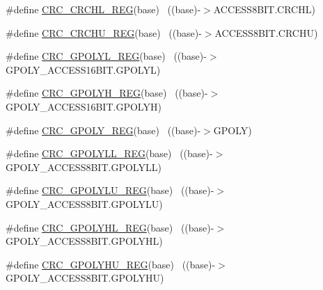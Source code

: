 \begin{DoxyCompactItemize}
\item 
\#define \hyperlink{group___c_r_c___register___accessor___macros_ga89be07710e8d08250ca3b8dcbf6dd7ad}{C\+R\+C\+\_\+\+C\+R\+C\+H\+L\+\_\+\+R\+EG}(base)                                        ~((base)-\/$>$A\+C\+C\+E\+S\+S8\+B\+I\+T.\+C\+R\+C\+HL)
\item 
\#define \hyperlink{group___c_r_c___register___accessor___macros_ga4cf80e6cff3baf934f320fa9d78e3723}{C\+R\+C\+\_\+\+C\+R\+C\+H\+U\+\_\+\+R\+EG}(base)                                        ~((base)-\/$>$A\+C\+C\+E\+S\+S8\+B\+I\+T.\+C\+R\+C\+HU)
\item 
\#define \hyperlink{group___c_r_c___register___accessor___macros_gab1698faf3a8970f99f403444ebb4d2c8}{C\+R\+C\+\_\+\+G\+P\+O\+L\+Y\+L\+\_\+\+R\+EG}(base)                                      ~((base)-\/$>$G\+P\+O\+L\+Y\+\_\+\+A\+C\+C\+E\+S\+S16\+B\+I\+T.\+G\+P\+O\+L\+YL)
\item 
\#define \hyperlink{group___c_r_c___register___accessor___macros_gafad4f84e32d790a7fe24cd92b2c480dd}{C\+R\+C\+\_\+\+G\+P\+O\+L\+Y\+H\+\_\+\+R\+EG}(base)                                      ~((base)-\/$>$G\+P\+O\+L\+Y\+\_\+\+A\+C\+C\+E\+S\+S16\+B\+I\+T.\+G\+P\+O\+L\+YH)
\item 
\#define \hyperlink{group___c_r_c___register___accessor___macros_ga4380a8ebc7eff991b5db31a826e12c34}{C\+R\+C\+\_\+\+G\+P\+O\+L\+Y\+\_\+\+R\+EG}(base)                                        ~((base)-\/$>$G\+P\+O\+LY)
\item 
\#define \hyperlink{group___c_r_c___register___accessor___macros_gaf49775745cf42c0370512f2c0058acd7}{C\+R\+C\+\_\+\+G\+P\+O\+L\+Y\+L\+L\+\_\+\+R\+EG}(base)                                    ~((base)-\/$>$G\+P\+O\+L\+Y\+\_\+\+A\+C\+C\+E\+S\+S8\+B\+I\+T.\+G\+P\+O\+L\+Y\+LL)
\item 
\#define \hyperlink{group___c_r_c___register___accessor___macros_ga1ad8ace74d9ab86940dfd4d066635b1c}{C\+R\+C\+\_\+\+G\+P\+O\+L\+Y\+L\+U\+\_\+\+R\+EG}(base)                                    ~((base)-\/$>$G\+P\+O\+L\+Y\+\_\+\+A\+C\+C\+E\+S\+S8\+B\+I\+T.\+G\+P\+O\+L\+Y\+LU)
\item 
\#define \hyperlink{group___c_r_c___register___accessor___macros_gac5b8db04ab62b0ea728987e54a9aab93}{C\+R\+C\+\_\+\+G\+P\+O\+L\+Y\+H\+L\+\_\+\+R\+EG}(base)                                    ~((base)-\/$>$G\+P\+O\+L\+Y\+\_\+\+A\+C\+C\+E\+S\+S8\+B\+I\+T.\+G\+P\+O\+L\+Y\+HL)
\item 
\#define \hyperlink{group___c_r_c___register___accessor___macros_ga1692656f77c7ec2de5c561f84e5811b2}{C\+R\+C\+\_\+\+G\+P\+O\+L\+Y\+H\+U\+\_\+\+R\+EG}(base)                                    ~((base)-\/$>$G\+P\+O\+L\+Y\+\_\+\+A\+C\+C\+E\+S\+S8\+B\+I\+T.\+G\+P\+O\+L\+Y\+HU)

\end{DoxyCompactItemize}
